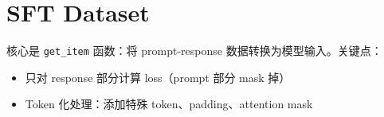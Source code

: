 \section{SFT Dataset}
核心是 \texttt{get\_item} 函数：将 prompt-response 数据转换为模型输入。关键点：
\begin{itemize}
  \item 只对 response 部分计算 loss（prompt 部分 mask 掉）
  \item Token 化处理：添加特殊 token、padding、attention mask
\end{itemize}

